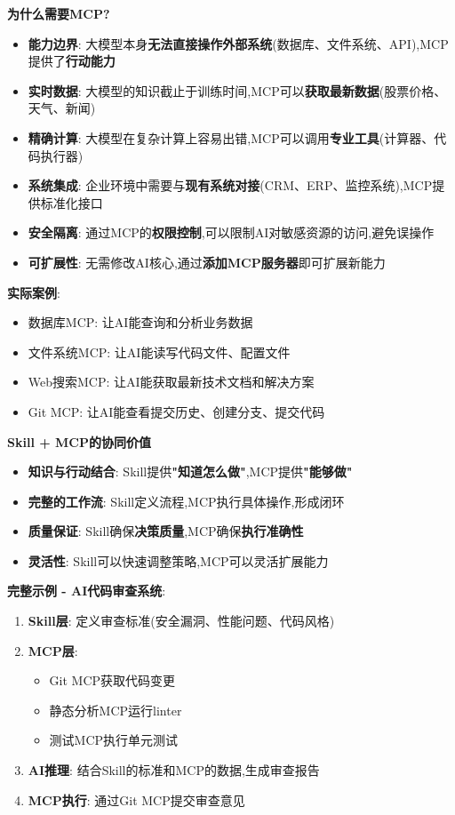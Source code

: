 \documentclass[UTF8]{ctexart}
\begin{document}
\textbf{为什么需要MCP?}

\begin{itemize}
    \item \textbf{能力边界}: 大模型本身\textbf{无法直接操作外部系统}(数据库、文件系统、API),MCP提供了\textbf{行动能力}
    \item \textbf{实时数据}: 大模型的知识截止于训练时间,MCP可以\textbf{获取最新数据}(股票价格、天气、新闻)
    \item \textbf{精确计算}: 大模型在复杂计算上容易出错,MCP可以调用\textbf{专业工具}(计算器、代码执行器)
    \item \textbf{系统集成}: 企业环境中需要与\textbf{现有系统对接}(CRM、ERP、监控系统),MCP提供标准化接口
    \item \textbf{安全隔离}: 通过MCP的\textbf{权限控制},可以限制AI对敏感资源的访问,避免误操作
    \item \textbf{可扩展性}: 无需修改AI核心,通过\textbf{添加MCP服务器}即可扩展新能力
\end{itemize}

\textbf{实际案例}:
\begin{itemize}
    \item 数据库MCP: 让AI能查询和分析业务数据
    \item 文件系统MCP: 让AI能读写代码文件、配置文件
    \item Web搜索MCP: 让AI能获取最新技术文档和解决方案
    \item Git MCP: 让AI能查看提交历史、创建分支、提交代码
\end{itemize}

\textbf{Skill + MCP的协同价值}

\begin{itemize}
    \item \textbf{知识与行动结合}: Skill提供\textbf{"知道怎么做"},MCP提供\textbf{"能够做"}
    \item \textbf{完整的工作流}: Skill定义流程,MCP执行具体操作,形成闭环
    \item \textbf{质量保证}: Skill确保\textbf{决策质量},MCP确保\textbf{执行准确性}
    \item \textbf{灵活性}: Skill可以快速调整策略,MCP可以灵活扩展能力
\end{itemize}

\textbf{完整示例 - AI代码审查系统}:
\begin{enumerate}
    \item \textbf{Skill层}: 定义审查标准(安全漏洞、性能问题、代码风格)
    \item \textbf{MCP层}: 
    \begin{itemize}
        \item Git MCP获取代码变更
        \item 静态分析MCP运行linter
        \item 测试MCP执行单元测试
    \end{itemize}
    \item \textbf{AI推理}: 结合Skill的标准和MCP的数据,生成审查报告
    \item \textbf{MCP执行}: 通过Git MCP提交审查意见
\end{enumerate}
\end{document}
